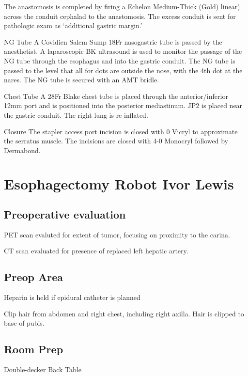 \documentclass[
  letterpaper,
]{scrbook}
\begin{document}
The anastomosis is completed by firing a Echelon Medium-Thick (Gold)
linear) across the conduit cephalad to the anastomosis. The excess
conduit is sent for pathologic exam as `additional gastric margin.'

NG Tube A Covidien Salem Sump 18Fr nasogastric tube is passed by the
anesthetist. A laparoscopic BK ultrasound is used to monitor the passage
of the NG tube through the esophagus and into the gastric conduit. The
NG tube is passed to the level that all for dots are outside the nose,
with the 4th dot at the nares. The NG tube is secured with an AMT
bridle.

Chest Tube A 28Fr Blake chest tube is placed through the
anterior/inferior 12mm port and is positioned into the posterior
mediastinum. JP2 is placed near the gastric conduit. The right lung is
re-inflated.

Closure The stapler access port incision is closed with 0 Vicryl to
approximate the serratus muscle. The incisions are closed with 4-0
Monocryl followed by Dermabond.

\chapter{Esophagectomy Robot Ivor
Lewis}\label{esophagectomy-robot-ivor-lewis}

\section{Preoperative evaluation}\label{preoperative-evaluation}

PET scan evaluted for extent of tumor, focusing on proximity to the
carina.

CT scan evaluated for presence of replaced left hepatic artery.

\section{Preop Area}\label{preop-area}

Heparin is held if epidural catheter is planned

Clip hair from abdomen and right chest, including right axilla. Hair is
clipped to base of pubis.

\section{Room Prep}\label{room-prep-1}

Double-decker Back Table
\end{document}
